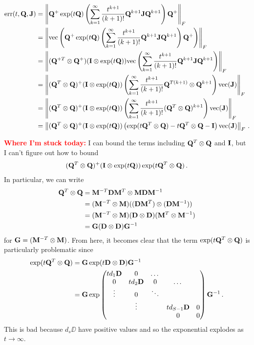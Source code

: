 \documentclass[12pt]{article} %
\begin{document}
\begin{align*}
	\mbox{err}(t,\mathbf{Q},\mathbf{J})&=  \left\Vert \mathbf{Q}^+ \exp(t\mathbf{Q}) \left( \sum_{k=1}^\infty \frac{t^{k+1}}{(k+1)!} \mathbf{Q}^{k+1}\mathbf{J}\mathbf{Q}^{k+1} \right) \mathbf{Q}^+ \right\Vert _F \\
	&=  \left\Vert \mbox{vec} \left(\mathbf{Q}^+ \exp(t\mathbf{Q}) \left( \sum_{k=1}^\infty \frac{t^{k+1}}{(k+1)!} \mathbf{Q}^{k+1}\mathbf{J}\mathbf{Q}^{k+1} \right) \mathbf{Q}^+ \right) \right\Vert _F \\
	&= \left\Vert  (\mathbf{Q}^{+T} \otimes \mathbf{Q}^+) (\mathbf{I} \otimes \exp(t\mathbf{Q})) \mbox{vec} \left( \sum_{k=1}^\infty \frac{t^{k+1}}{(k+1)!} \mathbf{Q}^{k+1}\mathbf{J}\mathbf{Q}^{k+1} \right)    \right\Vert_F  \\
	&= \left\Vert  (\mathbf{Q}^T \otimes \mathbf{Q})^+ (\mathbf{I} \otimes \exp(t\mathbf{Q})) \left( \sum_{k=1}^\infty \frac{t^{k+1}}{(k+1)!} \mathbf{Q}^{T(k+1)} \otimes \mathbf{Q}^{k+1}  \right)   \mbox{vec}(\mathbf{J})  \right\Vert_F  \\
	&= \left\Vert  (\mathbf{Q}^T \otimes \mathbf{Q})^+ (\mathbf{I} \otimes \exp(t\mathbf{Q})) \left( \sum_{k=1}^\infty \frac{t^{k+1}}{(k+1)!} (\mathbf{Q}^{T} \otimes \mathbf{Q})^{k+1}  \right)   \mbox{vec}(\mathbf{J})  \right\Vert_F  \\
	&= \left\Vert  (\mathbf{Q}^T \otimes \mathbf{Q})^+ (\mathbf{I} \otimes \exp(t\mathbf{Q})) \left( \exp(t\mathbf{Q}^T\otimes \mathbf{Q}) - t\mathbf{Q}^T\otimes \mathbf{Q} - \mathbf{I} \right)   \mbox{vec}(\mathbf{J})  \right\Vert_F  \, .
\end{align*}

\textcolor{red}{\textbf{Where I'm stuck today:}}  I can bound the terms including $\mathbf{Q}^T\otimes \mathbf{Q}$ and $\mathbf{I}$, but I can't figure out how to bound 
\begin{align*}
 (\mathbf{Q}^T \otimes \mathbf{Q})^+ (\mathbf{I} \otimes \exp(t\mathbf{Q})) \exp(t\mathbf{Q}^T\otimes \mathbf{Q}) \, .
\end{align*}
In particular, we can write
\begin{align*}
	\mathbf{Q}^T \otimes \mathbf{Q} &= \mathbf{M}^{-T} \mathbf{D} \mathbf{M}^T \otimes \mathbf{M} \mathbf{D} \mathbf{M}^{-1} \\
	&=  (\mathbf{M}^{-T} \otimes \mathbf{M})  ((\mathbf{D} \mathbf{M}^T) \otimes  (\mathbf{D} \mathbf{M}^{-1})) \\
	&= (\mathbf{M}^{-T} \otimes \mathbf{M})  (\mathbf{D}  \otimes  \mathbf{D}) (\mathbf{M}^{T} \otimes \mathbf{M}^{-1}) \\
	&= \mathbf{G} (\mathbf{D}  \otimes  \mathbf{D}) \mathbf{G}^{-1} 
\end{align*}
for $\mathbf{G} = (\mathbf{M}^{-T} \otimes \mathbf{M})$.  From here, it becomes clear that the term $\exp(t\mathbf{Q}^T\otimes \mathbf{Q})$ is particularly problematic since
\begin{align*}
\exp(t\mathbf{Q}^T\otimes \mathbf{Q}) &= \mathbf{G} \exp(t \mathbf{D}\otimes \mathbf{D}) \mathbf{G}^{-1} \\
&= \mathbf{G} \exp \begin{pmatrix}
	 td_1 \mathbf{D}	& 0 &\dots & & \\
	0  & td_2 \mathbf{D} &0  & \dots& \\
	\vdots &0 & \ddots & \\
	& \vdots& & td_{S-1} \mathbf{D} &0 \\
	&&&0&0
\end{pmatrix}  \mathbf{G}^{-1} \, .
\end{align*}
This is bad because $d_s\DD$ have positive values and so the exponential explodes as $t\rightarrow \infty$.
\end{document}
